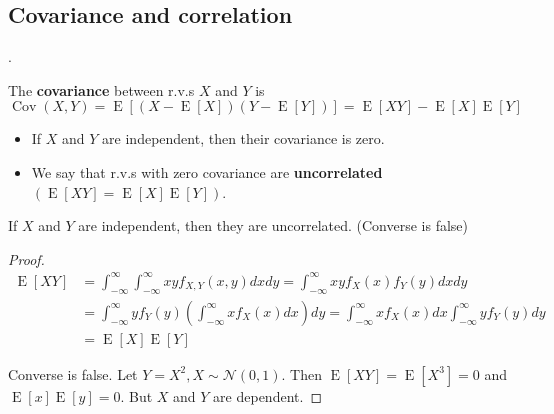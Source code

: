 \documentclass[8pt]{beamer}
\newcommand{\mc}[1]{\mathcal{#1}}
\newcommand{\tb}[1]{\textbf{#1}}
\newcommand{\expec}[1]{\operatorname{E}\left[ #1 \right]}
\newcommand{\Cov}[2]{\operatorname{Cov}\!\left(#1, #2\right)}
\newcommand{\intinfty}{\int_{-\infty}^\infty}
\begin{document}
\subsection{Covariance and correlation}

\begin{frame}{.}
    \begin{definition}[Covariance]
        The \tb{covariance} between r.v.s $X$ and $Y$ is 
        \[
            \Cov{X}{Y} = \expec{(X - \expec{X})(Y - \expec{Y})} = \expec{XY} - \expec{X}\expec{Y}
        \]
        \begin{itemize}
            \item If $X$ and $Y$ are independent, then their covariance is zero. 
            \item We say that r.v.s with zero covariance are \tb{uncorrelated} $(\expec{XY} = \expec{X}\expec{Y})$.
        \end{itemize}
    \end{definition}

    \begin{theorem}
        If $X$ and  $Y$ are independent, then they are uncorrelated. (Converse is false)
    \end{theorem}

    \begin{proof}
        \[
        \begin{aligned}
            \expec{XY} &= \int_{-\infty}^\infty \int_{-\infty}^\infty xy f_{X,Y}(x,y) dx dy = \int_{-\infty}^\infty xy f_X(x)f_Y(y) dx dy \\
            &= \intinfty y f_Y(y) \left(\intinfty x f_X(x) dx \right) dy = \intinfty xf_X(x) dx \intinfty y f_Y(y) dy\\
            &=\expec{X}\expec{Y}
        \end{aligned}
        \]

        Converse is false. Let $Y = X^2, X \sim \mc{N}(0,1)$. Then $\expec{XY} = \expec{X^3} = 0$ and $\expec{x}\expec{y}= 0$. But $X$ and $Y$ are dependent.
    \end{proof}
\end{frame}
\end{document}
